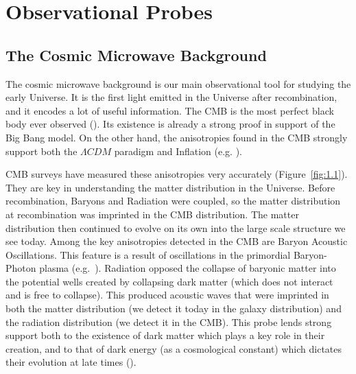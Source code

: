 


\section{Observational Probes}
\subsection{The Cosmic Microwave Background}

The cosmic microwave background is our main observational tool for studying the early Universe. It is the first light emitted in the Universe after recombination, and it encodes a lot of useful information. The CMB is the most perfect black body ever observed (\cite{1999dpf..conf.....W}). Its existence is already a strong proof in support of the Big Bang model. On the other hand, the anisotropies found in the CMB strongly support both the $\Lambda CDM$ paradigm and Inflation (e.g. \cite{2016A&A...594A..13P}).

CMB surveys have measured these anisotropies very accurately (Figure~\ref{fig:1.1}). They are key in understanding the matter distribution in the Universe. Before recombination, Baryons and Radiation were coupled, so the matter distribution at recombination was imprinted in the CMB distribution. The matter distribution then continued to evolve on its own into the large scale structure we see today. Among the key anisotropies detected in the CMB are Baryon Acoustic Oscillations. This feature is a result of oscillations in the primordial Baryon-Photon plasma (e.g.~\cite{bassett2010baryon}). Radiation opposed the collapse of baryonic matter into the potential wells created by collapsing dark matter (which does not interact and is free to collapse). This produced acoustic waves that were imprinted in both the matter distribution (we detect it today in the galaxy distribution) and the radiation distribution (we detect it in the CMB). This probe lends strong support both to the existence of dark matter which plays a key role in their creation, and to that of dark energy (as a cosmological constant) which dictates their evolution at late times (\cite{bassett2010baryon}).

